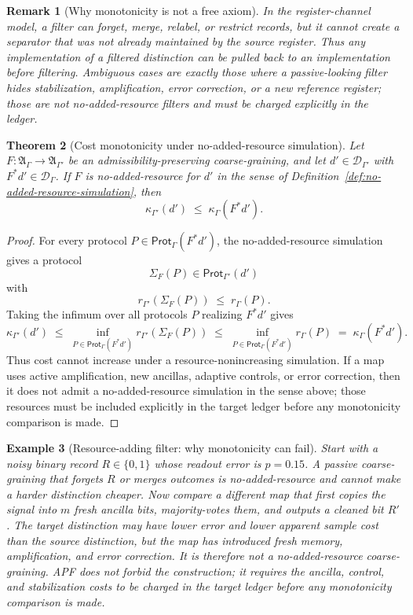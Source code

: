 \documentclass[11pt]{article}
\newtheorem{theorem}{Theorem}[section]
\newtheorem{example}[theorem]{Example}
\newtheorem{remark}[theorem]{Remark}
\newcommand{\A}{\mathfrak A}
\begin{document}
\begin{remark}[Why monotonicity is not a free axiom]\label{rem:cost-monotonicity-model}
In the register-channel model, a filter can forget, merge, relabel, or restrict records, but it cannot create a separator that was not already maintained by the source register.  Thus any implementation of a filtered distinction can be pulled back to an implementation before filtering.  Ambiguous cases are exactly those where a passive-looking filter hides stabilization, amplification, error correction, or a new reference register; those are not no-added-resource filters and must be charged explicitly in the ledger.
\end{remark}
\begin{theorem}[Cost monotonicity under no-added-resource simulation]\label{thm:cost-monotonicity-no-added}
Let $F:\A_\Gamma\to\A_{\Gamma'}$ be an admissibility-preserving
coarse-graining, and let $d'\in\mathcal D_{\Gamma'}$ with
$F^*d'\in\mathcal D_\Gamma$.  If $F$ is no-added-resource for $d'$ in
the sense of Definition~\ref{def:no-added-resource-simulation}, then
\[
 \kappa_{\Gamma'}(d')\;\le\;\kappa_\Gamma(F^*d').
\]
\end{theorem}
\begin{proof}
For every protocol $P\in\mathsf{Prot}_\Gamma(F^*d')$, the
no-added-resource simulation gives a protocol
\[
    \Sigma_F(P)\in\mathsf{Prot}_{\Gamma'}(d')
\]
with
\[
    r_{\Gamma'}(\Sigma_F(P))\;\le\;r_\Gamma(P).
\]
Taking the infimum over all protocols $P$ realizing $F^*d'$ gives
\[
    \kappa_{\Gamma'}(d')
    \;\le\;
    \inf_{P\in\mathsf{Prot}_\Gamma(F^*d')} r_{\Gamma'}(\Sigma_F(P))
    \;\le\;
    \inf_{P\in\mathsf{Prot}_\Gamma(F^*d')} r_\Gamma(P)
    \;=\;
    \kappa_\Gamma(F^*d').
\]
Thus cost cannot increase under a resource-nonincreasing simulation.
If a map uses active amplification, new ancillas, adaptive controls,
or error correction, then it does not admit a no-added-resource
simulation in the sense above; those resources must be included
explicitly in the target ledger before any monotonicity comparison is
made.
\end{proof}


\begin{example}[Resource-adding filter: why monotonicity can fail]\label{ex:resource-adding-filter-counterexample}
Start with a noisy binary record $R\in\{0,1\}$ whose readout error is $p=0.15$.  A passive coarse-graining that forgets $R$ or merges outcomes is no-added-resource and cannot make a harder distinction cheaper.  Now compare a different map that first copies the signal into $m$ fresh ancilla bits, majority-votes them, and outputs a cleaned bit $R'$.  The target distinction may have lower error and lower apparent sample cost than the source distinction, but the map has introduced fresh memory, amplification, and error correction.  It is therefore not a no-added-resource coarse-graining.  APF does not forbid the construction; it requires the ancilla, control, and stabilization costs to be charged in the target ledger before any monotonicity comparison is made.
\end{example}
\end{document}
